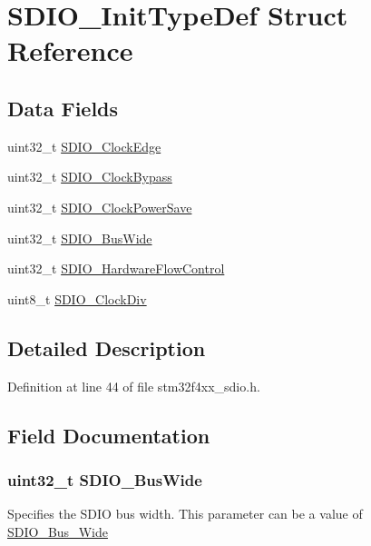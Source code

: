 \hypertarget{struct_s_d_i_o___init_type_def}{\section{S\-D\-I\-O\-\_\-\-Init\-Type\-Def Struct Reference}
\label{struct_s_d_i_o___init_type_def}
}
\subsection*{Data Fields}
\begin{DoxyCompactItemize}
\item 
uint32\-\_\-t \hyperlink{struct_s_d_i_o___init_type_def_a9005baa5fb30fb068fbdbbf8856c651e}{S\-D\-I\-O\-\_\-\-Clock\-Edge}
\item 
uint32\-\_\-t \hyperlink{struct_s_d_i_o___init_type_def_a30c395781536ad414f2dba26b1ad1e72}{S\-D\-I\-O\-\_\-\-Clock\-Bypass}
\item 
uint32\-\_\-t \hyperlink{struct_s_d_i_o___init_type_def_a31edc8c1d4672ddb1ea60e22585398af}{S\-D\-I\-O\-\_\-\-Clock\-Power\-Save}
\item 
uint32\-\_\-t \hyperlink{struct_s_d_i_o___init_type_def_ad128ddfd60ebdf846d0f07548ef9cf66}{S\-D\-I\-O\-\_\-\-Bus\-Wide}
\item 
uint32\-\_\-t \hyperlink{struct_s_d_i_o___init_type_def_a2acacb64a58fbff9d7a31e6e0c0a3d2e}{S\-D\-I\-O\-\_\-\-Hardware\-Flow\-Control}
\item 
uint8\-\_\-t \hyperlink{struct_s_d_i_o___init_type_def_a9f37419ca4d1fa1d39f93c12c2b2e91b}{S\-D\-I\-O\-\_\-\-Clock\-Div}
\end{DoxyCompactItemize}


\subsection{Detailed Description}


Definition at line 44 of file stm32f4xx\-\_\-sdio.\-h.



\subsection{Field Documentation}
\hypertarget{struct_s_d_i_o___init_type_def_ad128ddfd60ebdf846d0f07548ef9cf66}{
\subsubsection[{S\-D\-I\-O\-\_\-\-Bus\-Wide}]{\setlength{\rightskip}{0pt plus 5cm}uint32\-\_\-t S\-D\-I\-O\-\_\-\-Bus\-Wide}}\label{struct_s_d_i_o___init_type_def_ad128ddfd60ebdf846d0f07548ef9cf66}
Specifies the S\-D\-I\-O bus width. This parameter can be a value of \hyperlink{group___s_d_i_o___bus___wide}{S\-D\-I\-O\-\_\-\-Bus\-\_\-\-Wide} 

